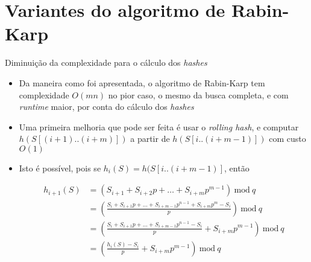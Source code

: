 \section{Variantes do algoritmo de Rabin-Karp}

\begin{frame}[fragile]{Diminuição da complexidade para o cálculo dos {\it hashes}}

    \begin{itemize}
        \item  Da maneira como foi apresentada, o algoritmo de Rabin-Karp tem complexidade 
            $O(mn)$ no pior caso, o mesmo da busca completa, e com \textit{runtime} maior,
            por conta do cálculo dos \textit{hashes}

        \item Uma primeira melhoria que pode ser feita é usar o \textit{rolling hash}, e computar
            $h(S[(i+1)..(i+m)])$ a partir de $h(S[i..(i + m -1)])$ com custo $O(1)$

        \item Isto é possível, pois se $h_i(S) = h(S[i..(i + m - 1)]$, então
        \begin{small}
        \begin{align*}
            h_{i + 1}(S)
            &= \left(S_{i+1} + S_{i + 2}p + \ldots + S_{i+m}p^{m - 1}\right)\ \mbox{mod}\ q \\
            &= \left(\frac{S_i + S_{i+1}p + \ldots + S_{i+m-1}p^{n - 1} + S_{i+m}p^m - S_i}{p} \right)\ \mbox{mod}\ q \\
            &= \left(\frac{S_i + S_{i+1}p + \ldots + S_{i+m-1}p^{n - 1} - S_i}{p} + S_{i+m}p^{m -1} \right)\ \mbox{mod}\ q \\
            &= \left(\frac{h_i(S) - S_i}{p} + S_{i+m}p^{m -1}\right)\ \mbox{mod}\ q 
        \end{align*}
        \end{small}
         
    \end{itemize}

\end{frame}

